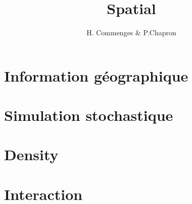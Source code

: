 \documentclass{beamer}
\author{H. Commenges & P.Chapron}
\title{Spatial}
\date{}
\begin{document}
\section{Information géographique}

  
  
  
  
\section{Simulation stochastique}

  
  
\section{Density}

 

\section{Interaction}

  




  
\end{document}
